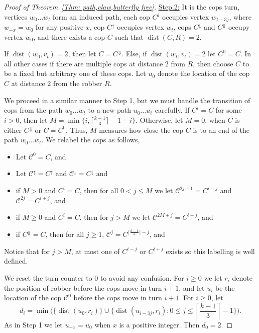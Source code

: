 \documentclass[12pt]{article}
\theoremstyle{definition}
\DeclareMathOperator{\dist}{dist}
\begin{document}
\begin{proof}[Proof of Theorem~\ref{Thm: path,claw,butterfly free}]
\vspace{0.25cm}
\noindent\underline{Step.2:} It is the cops turn, vertices $w_0\dots w_t$ form an induced path, each cop $C^j$ occupies vertex $w_{t-3j}$, 
where $w_{-x} = w_0$ for any positive $x$, 
cop $C^\uparrow$ occupies vertex $w_t$,
cops $C^\downarrow$ and $C^\Downarrow$ occupy vertex $w_0$,
and there exists a cop $C$ such that $\dist(C,R) = 2$.
\vspace{0.25cm}

If $\dist(w_0,v_t) = 2$, then let $C = C^{\Downarrow}$. 
Else, if $\dist(w_t,v_t) = 2$ let $C^0 = C$.
In all other cases if there are multiple cops at distance $2$ from $R$, then choose $C$ to be a fixed but arbitrary one of these cops.
Let $u_0$ denote the location of the cop $C$ at distance $2$ from the robber $R$.

We proceed in a similar manner to Step 1, 
but we must handle the transition of cops from the path $w_0\dots w_t$ to a new path $u_0\dots u_\ell$ carefully.
If $C^i = C$ for some $i>0$, then let $M = \min\{i, \lceil \frac{k-1}{3} \rceil-1-i\}$.
Otherwise, let $M = 0$, when $C$ is either $C^\Downarrow$ or $C=C^0$.
Thus, $M$ measures how close the cop $C$ is to an end of the path $w_0\dots w_t$.
We relabel the cops as follows, 
\begin{itemize}
    \item Let $\mathcal{C}^0 = C$, and
    \item Let $\mathcal{C}^\uparrow = C^\uparrow$ and $\mathcal{C}^\downarrow = C^\downarrow$  and
    \item if $M>0$ and $C^i = C$, then for all $0 < j \leq M$ we let $\mathcal{C}^{2j-1} = C^{i-j}$ and $\mathcal{C}^{2j} = C^{i+j}$, and
    \item if $M\geq 0$ and $C^i = C$, then for $j > M$ we let $\mathcal{C}^{2M+j} = C^{i\pm j}$, and
    \item if $C^\Downarrow = C$, then for all $j\geq 1$, $\mathcal{C}^j = C^{\lceil \frac{k-1}{3} \rceil  -j}$, and
\end{itemize}
Notice that for $j>M$, at most one of $C^{i-j}$ or $C^{i+j}$ exists so this labelling is well defined.

We reset the turn counter to $0$ to avoid any confusion.
For $i\geq 0$ we let $r_i$ denote the position of robber before the cops move in turn $i+1$, 
and let $u_i$ be the location of the cop $\mathcal{C}^0$ before the cops move in turn $i+1$.
For $i\geq 0$, 
let 
\[
d_i = \min\Big(\Big\{\dist(u_0,r_i)\Big\} \cup  \Big\{\dist(u_{i-3j},r_i): 0 \leq j \leq \left\lceil\frac{k-1}{3} \right\rceil-1\Big\} \Big).
\]
As in Step 1 we let $u_{-x} = u_0$  when $x$ is a positive integer.
Then $d_0 = 2$.



\end{proof}
\end{document}
